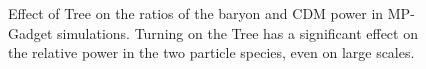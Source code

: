 \documentclass[]{article}
\begin{document}
\begin{figure}[h]
	\caption{Effect of Tree on the ratios of the baryon and CDM power in MP-Gadget simulations. Turning on the Tree has a significant effect on the relative power in the two particle species, even on large scales.
\label{fig:treenotree}}
\end{figure}

\clearpage
\end{document}
